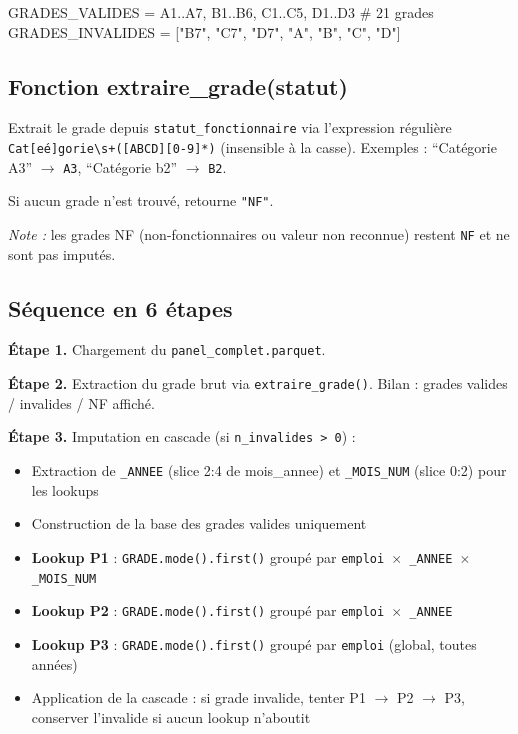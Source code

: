\documentclass[12pt,a4paper,french]{report}
\begin{document}
\begin{codebox}[]
GRADES\_VALIDES = A1..A7, B1..B6, C1..C5, D1..D3  # 21 grades
GRADES\_INVALIDES = ["B7", "C7", "D7", "A", "B", "C", "D"]
\end{codebox}

\subsection{Fonction extraire\_grade(statut)}

Extrait le grade depuis \texttt{statut\_fonctionnaire} via l'expression
régulière \texttt{Cat[eé]gorie\textbackslash{}s+([ABCD][0-9]*)}
(insensible à la casse). Exemples : ``Catégorie A3'' $\rightarrow$
\texttt{A3}, ``Catégorie b2'' $\rightarrow$ \texttt{B2}.

Si aucun grade n'est trouvé, retourne \texttt{"NF"}.

\textit{Note :} les grades NF (non-fonctionnaires ou valeur non reconnue)
restent \texttt{NF} et ne sont pas imputés.

\subsection{Séquence en 6 étapes}

\textbf{Étape 1.} Chargement du \texttt{panel\_complet.parquet}.

\textbf{Étape 2.} Extraction du grade brut via \texttt{extraire\_grade()}.
Bilan : grades valides / invalides / NF affiché.

\textbf{Étape 3.} Imputation en cascade (si \texttt{n\_invalides > 0}) :
\begin{itemize}
  \item Extraction de \texttt{\_ANNEE} (slice 2:4 de mois\_annee) et
        \texttt{\_MOIS\_NUM} (slice 0:2) pour les lookups
  \item Construction de la base des grades valides uniquement
  \item \textbf{Lookup P1} : \texttt{GRADE.mode().first()} groupé par
        \texttt{emploi $\times$ \_ANNEE $\times$ \_MOIS\_NUM}
  \item \textbf{Lookup P2} : \texttt{GRADE.mode().first()} groupé par
        \texttt{emploi $\times$ \_ANNEE}
  \item \textbf{Lookup P3} : \texttt{GRADE.mode().first()} groupé par
        \texttt{emploi} (global, toutes années)
  \item Application de la cascade : si grade invalide, tenter P1 $\rightarrow$
        P2 $\rightarrow$ P3, conserver l'invalide si aucun lookup n'aboutit
\end{itemize}
\end{document}
